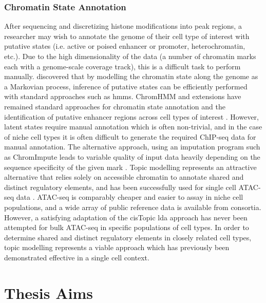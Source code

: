 \subsubsection{Chromatin State Annotation}

After sequencing and discretizing histone modifications into peak regions, a researcher may wish to annotate the genome of their cell type of interest with putative states (i.e. active or poised enhancer or promoter, heterochromatin, etc.). Due to the high dimensionality of the data (a number of chromatin marks each with a genome-scale coverage track), this is a difficult task to perform manually. \textcite{Ernst2012} discovered that by modelling the chromatin state along the genome as a Markovian process, inference of putative states can be efficiently performed with standard approaches such as \glspl{hmm}. ChromHMM and extensions have remained standard approaches for chromatin state annotation and the identification of putative enhancer regions across cell types of interest \cite{Ernst2017}. However, latent states require manual annotation which is often non-trivial, and in the case of niche cell types it is often difficult to generate the required ChIP-seq data for manual annotation. The alternative approach, using an imputation program such as ChromImpute leads to variable quality of input data heavily depending on the sequence specificity of the given mark \cite{Ernst2017}.  Topic modelling represents an attractive alternative that relies solely on accessible chromatin to annotate shared and distinct regulatory elements, and has been successfully used for single cell ATAC-seq data \cite{BravoGonzalez-Blas2019}. ATAC-seq is comparably cheaper and easier to assay in niche cell populations, and a wide array of public reference data is available from consortia.  However, a satisfying adaptation of the cisTopic \gls{lda} approach has never been attempted for bulk ATAC-seq in specific populations of cell types. In order to determine shared and distinct regulatory elements in closely related cell types, topic modelling represents a viable approach which has previously been demonstrated effective in a single cell context.

\section{Thesis Aims}


